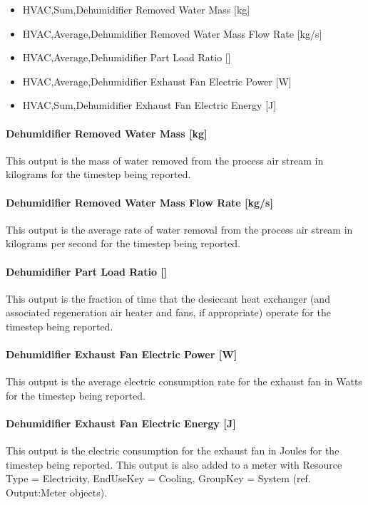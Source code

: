 \begin{itemize}
\item
  HVAC,Sum,Dehumidifier Removed Water Mass {[}kg{]}
\item
  HVAC,Average,Dehumidifier Removed Water Mass Flow Rate {[}kg/s{]}
\item
  HVAC,Average,Dehumidifier Part Load Ratio {[]}
\item
  HVAC,Average,Dehumidifier Exhaust Fan Electric Power {[}W{]}
\item
  HVAC,Sum,Dehumidifier Exhaust Fan Electric Energy {[}J{]}
\end{itemize}

\paragraph{Dehumidifier Removed Water Mass {[}kg{]}}\label{dehumidifier-removed-water-mass-kg-1}

This output is the mass of water removed from the process air stream in kilograms for the timestep being reported.

\paragraph{Dehumidifier Removed Water Mass Flow Rate {[}kg/s{]}}\label{dehumidifier-removed-water-mass-flow-rate-kgs-1}

This output is the average rate of water removal from the process air stream in kilograms per second for the timestep being reported.

\paragraph{Dehumidifier Part Load Ratio {[]}}\label{dehumidifier-part-load-ratio-1}

This output is the fraction of time that the desiccant heat exchanger (and associated regeneration air heater and fans, if appropriate) operate for the timestep being reported.

\paragraph{Dehumidifier Exhaust Fan Electric Power {[}W{]}}\label{dehumidifier-exhaust-fan-electric-power-w}

This output is the average electric consumption rate for the exhaust fan in Watts for the timestep being reported.

\paragraph{Dehumidifier Exhaust Fan Electric Energy {[}J{]}}\label{dehumidifier-exhaust-fan-electric-energy-j}

This output is the electric consumption for the exhaust fan in Joules for the timestep being reported. This output is also added to a meter with Resource Type = Electricity, EndUseKey = Cooling, GroupKey = System (ref. Output:Meter objects).
